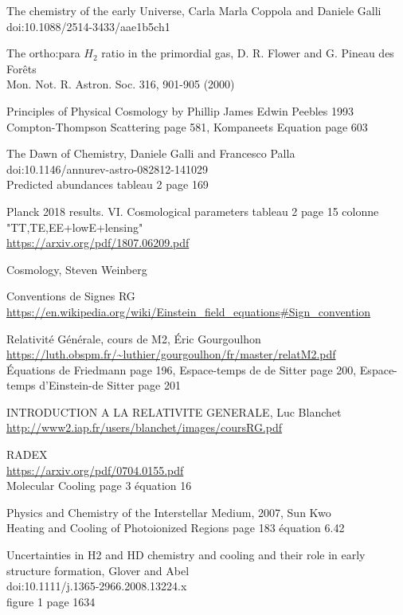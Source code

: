 \documentclass[10pt, a4paper]{report}
\numberwithin{equation}{subsection}
\begin{document}
\begin{thebibliography}{}

The chemistry of the early Universe, Carla Marla Coppola and Daniele Galli
\\doi:10.1088/2514-3433/aae1b5ch1

The ortho:para $H_2$ ratio in the primordial gas, D. R. Flower and G. Pineau des Forêts
\\Mon. Not. R. Astron. Soc. 316, 901-905 (2000)

Principles of Physical Cosmology by Phillip James Edwin Peebles 1993
\\Compton-Thompson Scattering page 581, Kompaneets Equation page 603

The Dawn of Chemistry, Daniele Galli and Francesco Palla
\\doi:10.1146/annurev-astro-082812-141029
\\Predicted abundances tableau 2 page 169

Planck 2018 results. VI. Cosmological parameters tableau 2 page 15 colonne "TT,TE,EE+lowE+lensing"
\\\url{https://arxiv.org/pdf/1807.06209.pdf}

Cosmology, Steven Weinberg

Conventions de Signes RG
\\\url{https://en.wikipedia.org/wiki/Einstein_field_equations#Sign_convention}

Relativité Générale, cours de M2, Éric Gourgoulhon
\\\url{https://luth.obspm.fr/~luthier/gourgoulhon/fr/master/relatM2.pdf}
\\Équations de Friedmann page 196, Espace-temps de de Sitter page 200, Espace-temps d’Einstein-de Sitter page 201

INTRODUCTION A LA RELATIVITE GENERALE, Luc Blanchet
\\\url{http://www2.iap.fr/users/blanchet/images/coursRG.pdf}

RADEX
\\\url{https://arxiv.org/pdf/0704.0155.pdf}
\\Molecular Cooling page 3 équation 16

Physics and Chemistry of the Interstellar Medium, 2007, Sun Kwo
\\Heating and Cooling of Photoionized Regions page 183 équation 6.42

Uncertainties in H2 and HD chemistry and cooling and their role in early structure formation, Glover and Abel
\\doi:10.1111/j.1365-2966.2008.13224.x
\\figure 1 page 1634



\end{thebibliography}
\end{document}
